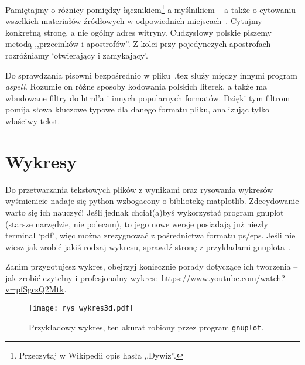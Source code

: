 \documentclass{article}
\begin{document}
Pamiętajmy o różnicy pomiędzy łącznikiem\footnote{Przeczytaj w Wikipedii opis hasła ,,Dywiz''.} a myślnikiem -- a także o cytowaniu wszelkich materiałów źródłowych w odpowiednich miejscach~\cite{WikiDash}. Cytujmy konkretną stronę, a nie ogólny adres witryny. Cudzysłowy polskie piszemy metodą ,,przecinków i apostrofów''. Z kolei przy pojedynczych apostrofach rozróżniamy `otwierający i zamykający'.

Do sprawdzania pisowni bezpośrednio w pliku\ .tex służy między innymi program \emph{aspell}. Rozumie on różne sposoby kodowania polskich literek, a także ma wbudowane filtry do html'a i innych popularnych formatów. Dzięki tym filtrom pomija słowa kluczowe typowe dla danego formatu pliku, analizując tylko właściwy tekst. %







\section{Wykresy}

\noindent Do przetwarzania tekstowych plików z wynikami oraz rysowania wykresów wyśmienicie nadaje się python wzbogacony o bibliotekę matplotlib. Zdecydowanie warto się ich nauczyć! Jeśli jednak chciał(a)byś wykorzystać program gnuplot (starsze narzędzie, nie polecam), to jego nowe wersje posiadają już niezły terminal `pdf', więc można zrezygnować z pośrednictwa formatu ps/eps. Jeśli nie wiesz jak zrobić jakiś rodzaj wykresu, sprawdź stronę z przykładami gnuplota~\cite{GnuplotDemos}.

Zanim przygotujesz wykres, obejrzyj koniecznie porady dotyczące ich tworzenia -- jak zrobić czytelny i profesjonalny wykres:~\url{https://www.youtube.com/watch?v=pfSgcsQ2Mtk}. %



\begin{figure}
\begin{center}
\texttt{[image: rys\_wykres3d.pdf]}
\end{center}
\caption{Przykładowy wykres, ten akurat robiony przez program \texttt{gnuplot}.}
\label{fig:3d}
\end{figure}
\end{document}

